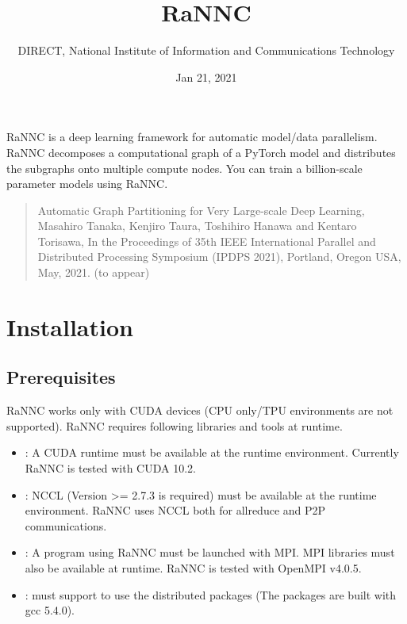 \documentclass[letterpaper,10pt,english]{sphinxmanual}
\title{RaNNC}
\date{Jan 21, 2021}
\author{DIRECT, National Institute of Information and Communications Technology}
\begin{document}
\pagestyle{empty}
\sphinxmaketitle
\pagestyle{plain}
\sphinxtableofcontents
\pagestyle{normal}
\label{\detokenize{index::doc}}


RaNNC is a deep learning framework for automatic model/data parallelism.
RaNNC decomposes a computational graph of a PyTorch model and distributes the subgraphs onto multiple compute nodes.
You can train a billion-scale parameter models using RaNNC.
\begin{quote}

Automatic Graph Partitioning for Very Large-scale Deep Learning, Masahiro Tanaka, Kenjiro Taura, Toshihiro Hanawa and Kentaro Torisawa, In the Proceedings of 35th IEEE International Parallel and Distributed Processing Symposium (IPDPS 2021), Portland, Oregon USA, May, 2021. (to appear)
\end{quote}


\chapter{Installation}
\label{\detokenize{installation:installation}}\label{\detokenize{installation::doc}}

\section{Prerequisites}
\label{\detokenize{installation:prerequisites}}
RaNNC works only with CUDA devices (CPU only/TPU environments are not supported).
RaNNC requires following libraries and tools at runtime.
\begin{itemize}
\item {} 
: A CUDA runtime must be available at the runtime environment. Currently RaNNC is tested with CUDA 10.2.

\item {} 
: NCCL (Version \textgreater{}= 2.7.3 is required) must be available at the runtime environment. RaNNC uses NCCL both for allreduce and P2P communications.

\item {} 
: A program using RaNNC must be launched with MPI. MPI libraries must also be available at runtime. RaNNC is tested with OpenMPI v4.0.5.

\item {} 
:  must support  to use the distributed  packages (The packages are built with gcc 5.4.0).

\end{itemize}
\end{document}
